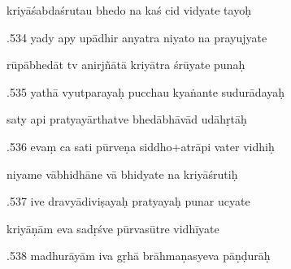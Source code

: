 \documentclass[article,12pt,a4paper]{memoir}%
\newcounter{parCount}
\begin{document}
	  
	  \pstart \leavevmode%
	kriyāśabdaśrutau bhedo na kaś cid vidyate tayoḥ 
	{}
	\pend%
      

	  
	  \pstart {}.534 yady apy upādhir anyatra niyato na prayujyate 
	{}
	\pend%
      

	  
	  \pstart \leavevmode%
	rūpābhedāt tv anirjñātā kriyātra śrūyate punaḥ 
	{}
	\pend%
      

	  
	  \pstart {}.535 yathā vyutparayaḥ pucchau kyaṅante sudurādayaḥ 
	{}
	\pend%
      

	  
	  \pstart \leavevmode%
	saty api pratyayārthatve bhedābhāvād udāhṛtāḥ 
	{}
	\pend%
      

	  
	  \pstart {}.536 evaṃ ca sati pūrveṇa siddho+atrāpi vater vidhiḥ 
	{}
	\pend%
      

	  
	  \pstart \leavevmode%
	niyame vābhidhāne vā bhidyate na kriyāśrutiḥ 
	{}
	\pend%
      

	  
	  \pstart {}.537 ive dravyādiviṣayaḥ pratyayaḥ punar ucyate 
	{}
	\pend%
      

	  
	  \pstart \leavevmode%
	kriyāṇām eva sadṛśve pūrvasūtre vidhīyate 
	{}
	\pend%
      

	  
	  \pstart {}.538 madhurāyām iva gṛhā brāhmaṇasyeva pāṇḍurāḥ 
	{}
	\pend%
      
\end{document}
